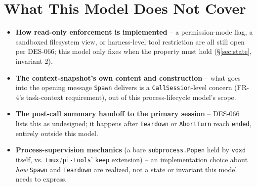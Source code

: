 \documentclass[a4paper,10pt,fleqn]{article}
\begin{document}
\section{What This Model Does Not Cover}

\begin{itemize}
  \item \textbf{How read-only enforcement is implemented} -- a permission-mode
    flag, a sandboxed filesystem view, or harness-level tool restriction are
    all still open per DES-066; this model only fixes when the property must
    hold (\S\ref{sec:state}, invariant 2).
  \item \textbf{The context-snapshot's own content and construction} -- what
    goes into the opening message \texttt{Spawn} delivers is a
    \texttt{CallSession}-level concern (FR-4's task-context requirement),
    out of this process-lifecycle model's scope.
  \item \textbf{The post-call summary handoff to the primary session} -- DES-066
    lists this as undesigned; it happens after \texttt{Teardown} or
    \texttt{AbortTurn} reach \texttt{ended}, entirely outside this model.
  \item \textbf{Process-supervision mechanics} (a bare \texttt{subprocess.Popen}
    held by \texttt{voxd} itself, vs. \texttt{tmux}/\texttt{pi-tools}' \texttt{keep}
    extension) -- an implementation choice about \emph{how} \texttt{Spawn} and
    \texttt{Teardown} are realized, not a state or invariant this model needs
    to express.
\end{itemize}
\end{document}
